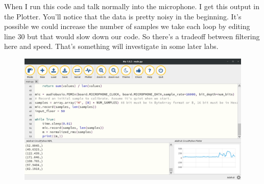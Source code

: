 {\begin{figure}[H]
\begin{center}
  \end{center}
\end{figure}
When I run this code and talk normally into the microphone. I get this
output in the Plotter. You’ll notice that the data is pretty noisy in
the beginning. It’s possible we could increase the number of samples
we take each loop by editing line 30 but that would slow down our
code. So there’s a tradeoff between filtering here and speed. That’s
something will investigate in some later labs. 
\begin{figure}[H]
  \begin{center}
    \includegraphics[width=\textwidth]{Figures/sound_mu.png}
  \end{center}
\end{figure}
}
